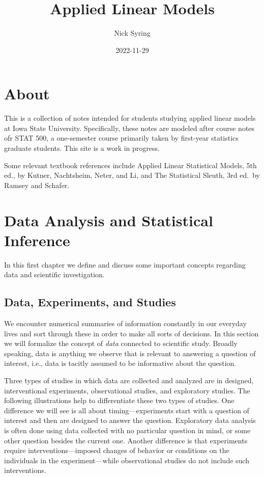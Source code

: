 \documentclass[
]{book}
\title{Applied Linear Models}
\author{Nick Syring}
\date{2022-11-29}
\begin{document}
\maketitle

{
\setcounter{tocdepth}{1}
\tableofcontents
}
\hypertarget{about}{%
\chapter{About}\label{about}}

This is a collection of notes intended for students studying applied linear models at Iowa State University. Specifically, these notes are modeled after course notes ofr STAT 500, a one-semester course primarily taken by first-year statistics graduate students. This site is a work in progress.

Some relevant textbook references include Applied Linear Statistical Models, 5th ed., by Kutner, Nachtsheim, Neter, and Li, and The Statistical Sleuth, 3rd ed.~by Ramsey and Schafer.

\hypertarget{data-analysis-and-statistical-inference}{%
\chapter{Data Analysis and Statistical Inference}\label{data-analysis-and-statistical-inference}}

In this first chapter we define and discuss some important concepts regarding data and scientific investigation.

\hypertarget{data-experiments-and-studies}{%
\section{Data, Experiments, and Studies}\label{data-experiments-and-studies}}

We encounter numerical summaries of information constantly in our everyday lives and sort through these in order to make all sorts of decisions. In this section we will formalize the concept of \emph{data} connected to scientific study. Broadly speaking, data is anything we observe that is relevant to answering a question of interest, i.e., data is tacitly assumed to be informative about the question.

Three types of studies in which data are collected and analyzed are in designed, interventional experiments, observational studies, and exploratory studies. The following illustrations help to differentiate these two types of studies. One difference we will see is all about timing---experiments start with a question of interest and then are designed to answer the question. Exploratory data analysis is often done using data collected with no particular question in mind, or some other question besides the current one. Another difference is that experiments require interventions---imposed changes of behavior or conditions on the individuals in the experiment---while observational studies do not include such interventions.
\end{document}
